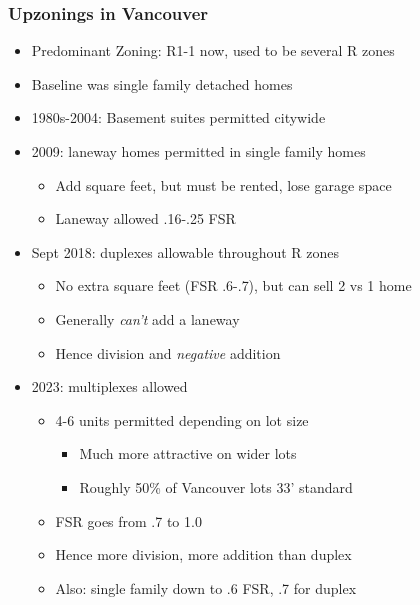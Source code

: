 \documentclass{beamer}
\begin{document}
\begin{frame}
	\frametitle{Upzonings in Vancouver}
	\begin{itemize}
		\item Predominant Zoning: R1-1 now, used to be several R zones
		\item Baseline was single family detached homes
		\item 1980s-2004: Basement suites permitted citywide 
		\item 2009: laneway homes permitted in single family homes
			\begin{itemize}
				\item Add square feet, but must be rented, lose garage space
				\item Laneway allowed .16-.25 FSR
			\end{itemize}
		\item Sept 2018: duplexes allowable throughout R zones
			\begin{itemize}
				\item No extra square feet (FSR .6-.7), but can sell 2 vs 1 home
				\item Generally \emph{can't} add a laneway
				\item Hence division and \emph{negative} addition 
			\end{itemize}
		\item 2023: multiplexes allowed
			\begin{itemize}
				\item 4-6 units permitted depending on lot size
					\begin{itemize}
						\item Much more attractive on wider lots
						\item Roughly 50\% of Vancouver lots 33' standard
					\end{itemize}
				\item FSR goes from .7 to 1.0
				\item Hence more division, more addition than duplex
				\item Also: single family down to .6 FSR, .7 for duplex
			\end{itemize}
	\end{itemize}
\end{frame}
\end{document}
